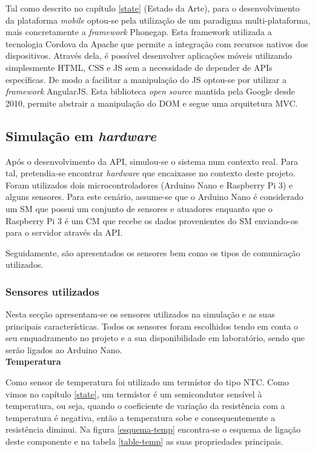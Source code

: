 Tal como descrito no capítulo \ref{state} (Estado da Arte), para o desenvolvimento da plataforma \textit{mobile} optou-se pela utilização de um paradigma multi-plataforma, mais concretamente a \textit{framework} Phonegap. Esta framework utilizada a tecnologia Cordova da Apache que permite a integração com recursos nativos dos dispositivos. Através dela, é possível desenvolver aplicações móveis utilizando simplesmente \ac{HTML}, \ac{CSS} e \ac{JS} sem a necessidade de depender de APIs específicas. De modo a facilitar a manipulação do \ac{JS} optou-se por utilizar a \textit{framework} AngularJS. Esta biblioteca \textit{open source} mantida pela Google desde 2010, permite abstrair a manipulação do \ac{DOM} e segue uma arquitetura \ac{MVC}\cite{Google2015}. 



\newpage
\subsection{Simulação em \textit{hardware}}
\label{arq-hardw}


Após o desenvolvimento da \ac{API}, simulou-se o sistema num contexto real. Para tal, pretendia-se encontrar \textit{hardware} que encaixasse no contexto deste projeto. Foram utilizados dois microcontroladores (Arduino Nano e Raspberry Pi 3) e alguns sensores. Para este cenário, assume-se que o Arduino Nano é considerado um \acl{SM} que possui um conjunto de sensores e atuadores enquanto que o Raspberry Pi 3 é um \acl{CM} que recebe os dados provenientes do \acl{SM} enviando-os para o servidor através da API.  

Seguidamente, são apresentados os sensores bem como os tipos de comunicação utilizados. 
 

\subsubsection{Sensores utilizados}

Nesta secção apresentam-se os sensores utilizados na simulação e as suas principais características. Todos os sensores foram escolhidos tendo em conta o seu enquadramento no projeto e a sua disponibilidade em laboratório, sendo que serão ligados ao Arduino Nano. \\


\textbf{Temperatura}


Como sensor de temperatura foi utilizado um termístor do tipo \ac{NTC}. Como vimos no capítulo \ref{state}, um termístor é um semicondutor sensível à temperatura, ou seja, quando o coeficiente de variação da resistência com a temperatura é negativa, então a temperatura sobe e consequentemente a resistência diminui. Na figura \ref{esquema-temp} encontra-se o esquema de ligação deste componente e na tabela \ref{table-temp} as suas propriedades principais\cite{temp-dta}. 


